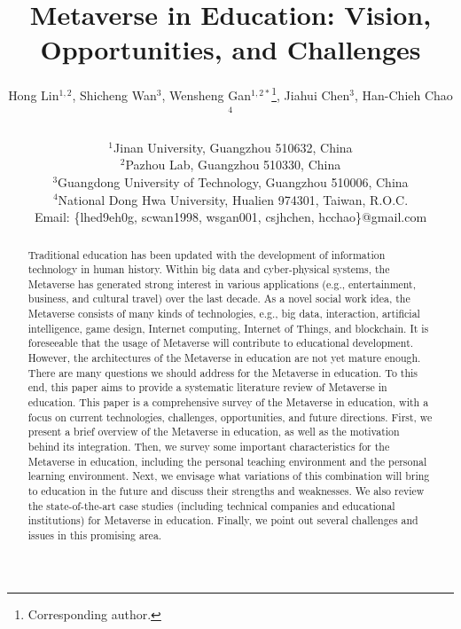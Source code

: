 \documentclass[conference]{IEEEtran}
\begin{document}
\title{Metaverse in Education: Vision, \\ Opportunities, and Challenges}

\author{Hong Lin$ ^{1,2}$, Shicheng Wan$ ^{3}$, Wensheng Gan$ ^{1,2*}$\thanks{Corresponding author.}, Jiahui Chen$ ^{3}$, Han-Chieh Chao$ ^{4}$ \\ 
	\\
	$ ^{1} $Jinan University, Guangzhou 510632, China\\
	$ ^{2} $Pazhou Lab, Guangzhou 510330, China\\
	$ ^{3} $Guangdong University of Technology, Guangzhou 510006, China\\
    $ ^{4} $National Dong Hwa University, Hualien 974301, Taiwan, R.O.C. \\
	Email: \{lhed9eh0g, scwan1998, wsgan001, csjhchen, hcchao\}@gmail.com
}


\maketitle


\begin{abstract}

Traditional education has been updated with the development of information technology in human history. Within big data and cyber-physical systems, the Metaverse has generated strong interest in various applications (e.g., entertainment, business, and cultural travel) over the last decade. As a novel social work idea, the Metaverse consists of many kinds of technologies, e.g., big data, interaction, artificial intelligence, game design, Internet computing, Internet of Things, and blockchain. It is foreseeable that the usage of Metaverse will contribute to educational development. However, the architectures of the Metaverse in education are not yet mature enough. There are many questions we should address for the Metaverse in education. To this end, this paper aims to provide a systematic literature review of Metaverse in education. This paper is a comprehensive survey of the Metaverse in education, with a focus on current technologies, challenges, opportunities, and future directions. First, we present a brief overview of the Metaverse in education, as well as the motivation behind its integration. Then, we survey some important characteristics for the Metaverse in education, including the personal teaching environment and the personal learning environment. Next, we envisage what variations of this combination will bring to education in the future and discuss their strengths and weaknesses. We also review the state-of-the-art case studies (including technical companies and educational institutions) for Metaverse in education. Finally, we point out several challenges and issues in this promising area.

\end{abstract}
\end{document}
